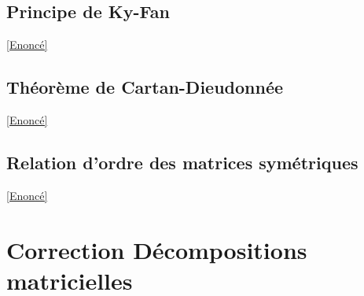 \documentclass[8pt]{book}
\begin{document}
	\subsection{Principe de Ky-Fan}
	\label{Principe de Ky-Fan corrigé}
	\textcolor{blue}{\hyperref[Principe de Ky-Fan]{[Enoncé]}}\\
	
	\subsection{Théorème de Cartan-Dieudonnée}
	\label{Théorème de Cartan-Dieudonnée corrigé}
	\textcolor{blue}{\hyperref[Théorème de Cartan-Dieudonnée]{[Enoncé]}}\\
	
	\subsection{Relation d'ordre des matrices symétriques}
	\label{Relation d'ordre des matrices symétriques corrigé}
	\textcolor{blue}{\hyperref[Relation d'ordre des matrices symétriques]{[Enoncé]}}\\
	
	\newpage
\section{Correction Décompositions matricielles}
\end{document}
